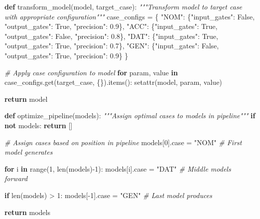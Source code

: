 \documentclass[
  11pt,
  letterpaper,
]{article}
\newenvironment{Shaded}{}{}
\newcommand{\BuiltInTok}[1]{#1}
\newcommand{\CommentTok}[1]{\textcolor[rgb]{0.38,0.63,0.69}{\textit{#1}}}
\newcommand{\ControlFlowTok}[1]{\textcolor[rgb]{0.00,0.44,0.13}{\textbf{#1}}}
\newcommand{\DecValTok}[1]{\textcolor[rgb]{0.25,0.63,0.44}{#1}}
\newcommand{\FloatTok}[1]{\textcolor[rgb]{0.25,0.63,0.44}{#1}}
\newcommand{\KeywordTok}[1]{\textcolor[rgb]{0.00,0.44,0.13}{\textbf{#1}}}
\newcommand{\NormalTok}[1]{#1}
\newcommand{\OperatorTok}[1]{\textcolor[rgb]{0.40,0.40,0.40}{#1}}
\newcommand{\StringTok}[1]{\textcolor[rgb]{0.25,0.44,0.63}{#1}}
\newcommand{\VariableTok}[1]{\textcolor[rgb]{0.10,0.09,0.49}{#1}}
\begin{document}
\begin{Shaded}
\begin{Highlighting}[]
\KeywordTok{def}\NormalTok{ transform\_model(model, target\_case):}
    \CommentTok{"""Transform model to target case with appropriate configuration"""}
\NormalTok{    case\_configs }\OperatorTok{=}\NormalTok{ \{}
        \StringTok{"NOM"}\NormalTok{: \{}\StringTok{"input\_gates"}\NormalTok{: }\VariableTok{False}\NormalTok{, }\StringTok{"output\_gates"}\NormalTok{: }\VariableTok{True}\NormalTok{, }\StringTok{"precision"}\NormalTok{: }\FloatTok{0.9}\NormalTok{\},}
        \StringTok{"ACC"}\NormalTok{: \{}\StringTok{"input\_gates"}\NormalTok{: }\VariableTok{True}\NormalTok{, }\StringTok{"output\_gates"}\NormalTok{: }\VariableTok{False}\NormalTok{, }\StringTok{"precision"}\NormalTok{: }\FloatTok{0.8}\NormalTok{\},}
        \StringTok{"DAT"}\NormalTok{: \{}\StringTok{"input\_gates"}\NormalTok{: }\VariableTok{True}\NormalTok{, }\StringTok{"output\_gates"}\NormalTok{: }\VariableTok{True}\NormalTok{, }\StringTok{"precision"}\NormalTok{: }\FloatTok{0.7}\NormalTok{\},}
        \StringTok{"GEN"}\NormalTok{: \{}\StringTok{"input\_gates"}\NormalTok{: }\VariableTok{False}\NormalTok{, }\StringTok{"output\_gates"}\NormalTok{: }\VariableTok{True}\NormalTok{, }\StringTok{"precision"}\NormalTok{: }\FloatTok{0.9}\NormalTok{\}}
\NormalTok{    \}}
    
    \CommentTok{\# Apply case configuration to model}
    \ControlFlowTok{for}\NormalTok{ param, value }\KeywordTok{in}\NormalTok{ case\_configs.get(target\_case, \{\}).items():}
        \BuiltInTok{setattr}\NormalTok{(model, param, value)}
    
    \ControlFlowTok{return}\NormalTok{ model}

\KeywordTok{def}\NormalTok{ optimize\_pipeline(models):}
    \CommentTok{"""Assign optimal cases to models in pipeline"""}
    \ControlFlowTok{if} \KeywordTok{not}\NormalTok{ models: }\ControlFlowTok{return}\NormalTok{ []}
    
    \CommentTok{\# Assign cases based on position in pipeline}
\NormalTok{    models[}\DecValTok{0}\NormalTok{].case }\OperatorTok{=} \StringTok{"NOM"}  \CommentTok{\# First model generates}
    
    \ControlFlowTok{for}\NormalTok{ i }\KeywordTok{in} \BuiltInTok{range}\NormalTok{(}\DecValTok{1}\NormalTok{, }\BuiltInTok{len}\NormalTok{(models)}\OperatorTok{{-}}\DecValTok{1}\NormalTok{):}
\NormalTok{        models[i].case }\OperatorTok{=} \StringTok{"DAT"}  \CommentTok{\# Middle models forward}
        
    \ControlFlowTok{if} \BuiltInTok{len}\NormalTok{(models) }\OperatorTok{\textgreater{}} \DecValTok{1}\NormalTok{:}
\NormalTok{        models[}\OperatorTok{{-}}\DecValTok{1}\NormalTok{].case }\OperatorTok{=} \StringTok{"GEN"}  \CommentTok{\# Last model produces}
        
    \ControlFlowTok{return}\NormalTok{ models}
\end{Highlighting}
\end{Shaded}
\end{document}
